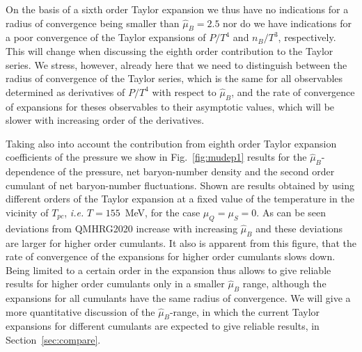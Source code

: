 \documentclass[pdflatex,prd,twocolumn,showpacs,superscriptaddress,nofootinbib]{revtex4-1}
\newcommand \hmu {\hat{\mu}}
\begin{document}
On the basis of a sixth order Taylor expansion we thus have no
indications for a radius of convergence being smaller than $\hmu_B=2.5$ nor do we have indications for a poor convergence of 
the Taylor expansions of $P/T^4$ and $n_B/T^3$, respectively. 
This will change
when discussing the eighth order contribution to the
Taylor series. We stress, however, already here that we need
to distinguish between the radius of convergence of the Taylor
series, which is the same for all observables determined as 
derivatives of $P/T^4$ with respect to $\hmu_B$, and the rate of convergence of expansions for theses observables to their asymptotic values, which will be slower with increasing order
of the derivatives.

Taking also into account the contribution from eighth order Taylor expansion coefficients of the pressure we show in Fig.~\ref{fig:mudep1} results for 
the $\hmu_B$-dependence of the pressure,
net baryon-number density and the second order cumulant of net baryon-number
fluctuations. Shown are results obtained by using different orders of the 
Taylor expansion at a fixed value
of the temperature in the vicinity of $T_{pc}$, {\it i.e.} $T=155$~MeV, for the case $\mu_Q=\mu_S=0$. As can be seen 
deviations from QMHRG2020 increase with increasing $\hmu_B$ and these deviations are larger for higher order cumulants. It also is apparent from this figure, that the rate of convergence of the expansions for higher order cumulants slows down. Being limited to a certain order in the expansion thus allows to give reliable results
for higher order cumulants only in a smaller 
$\hmu_B$ range, although the expansions for 
all cumulants have the same radius of convergence. We will give a more quantitative
discussion of the $\hmu_B$-range, in which 
the current Taylor expansions for different
cumulants are expected to give reliable results, in Section~\ref{sec:compare}.
\end{document}
